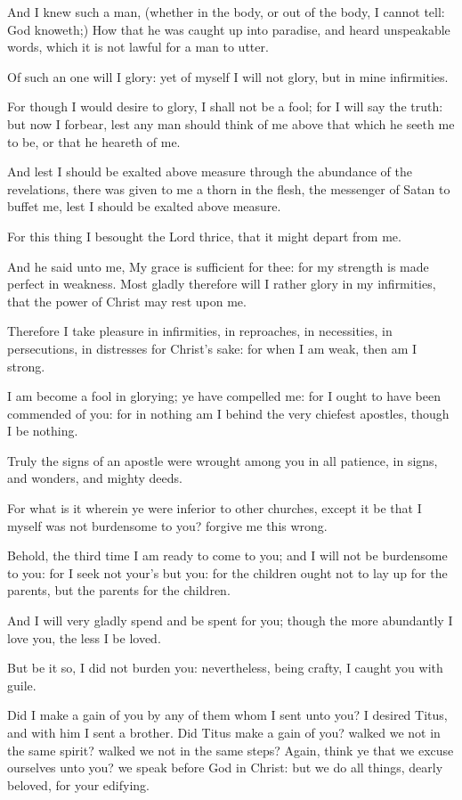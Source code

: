\Verse And I knew such a man, (whether in the body, or out of the body, I cannot tell: God knoweth;) \Verse How that he was caught up into paradise, and heard unspeakable words, which it is not lawful for a man to utter.

\Verse Of such an one will I glory: yet of myself I will not glory, but in mine infirmities.

\Verse For though I would desire to glory, I shall not be a fool; for I will say the truth: but now I forbear, lest any man should think of me above that which he seeth me to be, or that he heareth of me.

\Verse And lest I should be exalted above measure through the abundance of the revelations, there was given to me a thorn in the flesh, the messenger of Satan to buffet me, lest I should be exalted above measure.

\Verse For this thing I besought the Lord thrice, that it might depart from me.

\Verse And he said unto me, My grace is sufficient for thee: for my strength is made perfect in weakness. Most gladly therefore will I rather glory in my infirmities, that the power of Christ may rest upon me.

\Verse Therefore I take pleasure in infirmities, in reproaches, in necessities, in persecutions, in distresses for Christ's sake: for when I am weak, then am I strong.

\Verse I am become a fool in glorying; ye have compelled me: for I ought to have been commended of you: for in nothing am I behind the very chiefest apostles, though I be nothing.

\Verse Truly the signs of an apostle were wrought among you in all patience, in signs, and wonders, and mighty deeds.

\Verse For what is it wherein ye were inferior to other churches, except it be that I myself was not burdensome to you? forgive me this wrong.

\Verse Behold, the third time I am ready to come to you; and I will not be burdensome to you: for I seek not your's but you: for the children ought not to lay up for the parents, but the parents for the children.

\Verse And I will very gladly spend and be spent for you; though the more abundantly I love you, the less I be loved.

\Verse But be it so, I did not burden you: nevertheless, being crafty, I caught you with guile.

\Verse Did I make a gain of you by any of them whom I sent unto you?  \Verse I desired Titus, and with him I sent a brother. Did Titus make a gain of you? walked we not in the same spirit? walked we not in the same steps?  \Verse Again, think ye that we excuse ourselves unto you?  we speak before God in Christ: but we do all things, dearly beloved, for your edifying.

